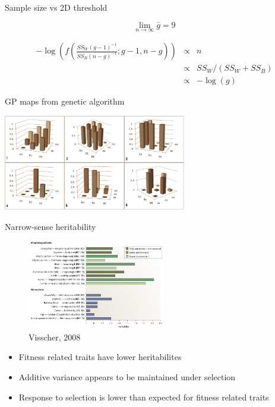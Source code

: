 \documentclass{beamer}
\begin{document}
\begin{frame}{Sample size vs 2D threshold}


	\begin{equation}
		\lim_{n \to \infty} \bar{g} = 9 \nonumber
	\end{equation}

	\begin{eqnarray}
		-\log \left ( f \left (
		\frac{
			SS_{W}  (g - 1)^{-1}
		}{
			SS_{B} (n - g)^{-1}
		};
		g - 1, n - g
		\right ) \right )
		& \propto &
			n \nonumber \\ 
		& \propto &
			SS_{W} / (SS_{W} + SS_{B}) \nonumber \\
		& \propto & -\log(g)
		\nonumber
	\end{eqnarray}

\end{frame}



\begin{frame}{GP maps from genetic algorithm}
	\begin{center}
		\includegraphics[width=8cm]{gpmaps2.pdf}
	\end{center}
\end{frame}

\begin{frame}{Narrow-sense heritability}
	\begin{figure}
		\includegraphics[width=6cm]{visscher2008_heritabiliy.jpg} \\
		{\tiny Visscher, 2008}
	\end{figure}
	\begin{itemize}
		\item Fitness related traits have lower heritabilites
		\item Additive variance appears to be maintained under selection
		\item Response to selection is lower than expected for fitness related traits
	\end{itemize}
\end{frame}
\end{document}
